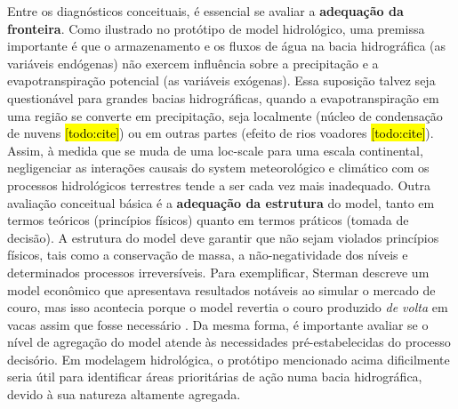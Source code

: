 \documentclass[./main.tex]{subfiles}
\begin{document}
\par Entre os diagnósticos conceituais, é essencial se avaliar a \textbf{adequação da fronteira}. Como ilustrado no protótipo de \gls{model} hidrológico, uma premissa importante é que o armazenamento e os fluxos de água na bacia hidrográfica (as variáveis endógenas) não exercem influência sobre a precipitação e a evapotranspiração potencial (as variáveis exógenas). Essa suposição talvez seja questionável para grandes bacias hidrográficas, quando a evapotranspiração em uma região se converte em precipitação, seja localmente (núcleo de condensação de nuvens \hl{[todo:cite]}) ou em outras partes (efeito de rios voadores \hl{[todo:cite]}). Assim, à medida que se muda de uma \gls{loc-scale} para uma escala continental, negligenciar as interações causais do \gls{system} meteorológico e climático com os processos hidrológicos terrestres tende a ser cada vez mais inadequado. Outra avaliação conceitual básica é a \textbf{adequação da estrutura} do \gls{model}, tanto em termos teóricos (princípios físicos) quanto em termos práticos (tomada de decisão). A estrutura do \gls{model} deve garantir que não sejam violados princípios físicos, tais como a conservação de massa, a não-negatividade dos níveis e determinados processos irreversíveis. Para exemplificar, Sterman descreve um \gls{model} econômico que apresentava resultados notáveis ao simular o mercado de couro, mas isso acontecia porque o \gls{model} revertia o couro produzido \textit{de volta} em vacas assim que fosse necessário \cite{sterman2000}. Da mesma forma, é importante avaliar se o nível de agregação do \gls{model} atende às necessidades pré-estabelecidas do processo decisório. Em modelagem hidrológica, o protótipo mencionado acima dificilmente seria útil para identificar áreas prioritárias de ação numa bacia hidrográfica, devido à sua natureza altamente agregada. 
\end{document}
